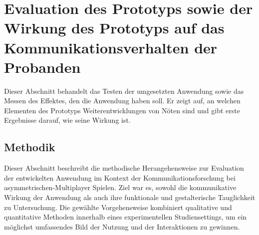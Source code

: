 \chapter{Evaluation des Prototyps sowie der Wirkung des Prototyps auf das Kommunikationsverhalten der Probanden}

Dieser Abschnitt behandelt das Testen der umgesetzten Anwendung sowie das Messen des Effektes, den die Anwendung haben soll. Er zeigt auf, an welchen Elementen des Prototyps Weiterentwicklungen von Nöten sind und gibt erste Ergebnisse darauf, wie seine Wirkung ist.



\section{Methodik}


Dieser Abschnitt beschreibt die methodische Herangehensweise zur Evaluation der entwickelten Anwendung im Kontext der Kommunikationsforschung bei asymmetrischen-Multiplayer Spielen. Ziel war es, sowohl die kommunikative Wirkung der Anwendung als auch ihre funktionale und gestalterische Tauglichkeit zu Untersuchung. Die gewählte Vorgehensweise kombiniert qualitative und quantitative Methoden innerhalb eines experimentellen Studiensettings, um ein möglichst umfassendes Bild der Nutzung und der Interaktionen zu gewinnen.

